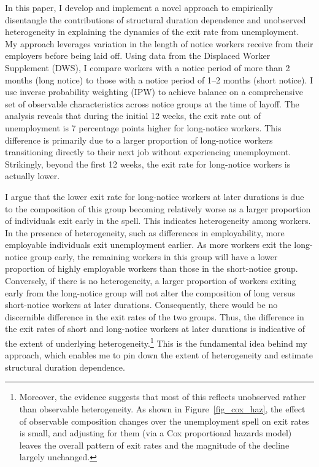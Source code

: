 \documentclass{div}
\newcommand{\NoticeOnJFinit}{7 }
\begin{document}
In this paper, I develop and implement a novel approach to empirically disentangle the contributions of structural duration dependence and unobserved heterogeneity in explaining the dynamics of the exit rate from unemployment. My approach leverages variation in the length of notice workers receive from their employers before being laid off. Using data from the Displaced Worker Supplement (DWS), I compare workers with a notice period of more than 2 months (long notice) to those with a notice period of 1--2 months (short notice). I use inverse probability weighting (IPW) to achieve balance on a comprehensive set of observable characteristics across notice groups at the time of layoff. The analysis reveals that during the initial 12 weeks, the exit rate out of unemployment is \NoticeOnJFinit percentage points higher for long-notice workers. This difference is primarily due to a larger proportion of long-notice workers transitioning directly to their next job without experiencing unemployment. Strikingly, beyond the first 12 weeks, the exit rate for long-notice workers is actually lower. 

I argue that the lower exit rate for long-notice workers at later durations is due to the composition of this group becoming relatively worse as a larger proportion of individuals exit early in the spell. This indicates heterogeneity among workers. In the presence of heterogeneity, such as differences in employability, more employable individuals exit unemployment earlier. As more workers exit the long-notice group early, the remaining workers in this group will have a lower proportion of highly employable workers than those in the short-notice group. Conversely, if there is no heterogeneity, a larger proportion of workers exiting early from the long-notice group will not alter the composition of long versus short-notice workers at later durations. Consequently, there would be no discernible difference in the exit rates of the two groups. Thus, the difference in the exit rates of short and long-notice workers at later durations is indicative of the extent of underlying heterogeneity.\footnote{Moreover, the evidence suggests that most of this reflects unobserved rather than observable heterogeneity. As shown in Figure~\ref{fig_cox_haz}, the effect of observable composition changes over the unemployment spell on exit rates is small, and adjusting for them (via a Cox proportional hazards model) leaves the overall pattern of exit rates and the magnitude of the decline largely unchanged.} This is the fundamental idea behind my approach, which enables me to pin down the extent of heterogeneity and estimate structural duration dependence.
\end{document}
